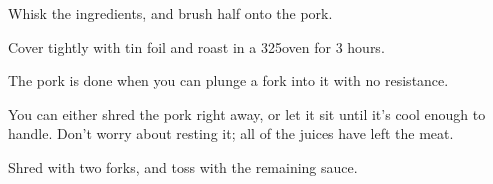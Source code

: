 \begin{recipe}

Whisk the ingredients, and brush half onto the pork.

Cover tightly with tin foil and roast in a 325\degree oven for 3 hours.

The pork is done when you can plunge a fork into it with no resistance.

You can either shred the pork right away, or let it sit until it's cool enough to handle. Don't worry about resting it; all of the juices have left the meat.

Shred with two forks, and toss with the remaining sauce.

\end{recipe}
